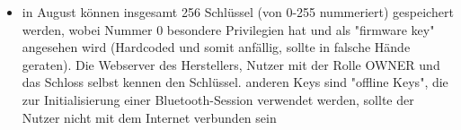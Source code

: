 \begin{itemize}
		    \item in August können insgesamt 256 Schlüssel (von 0-255 nummeriert) gespeichert werden, wobei Nummer 0 besondere Privilegien hat und als "firmware key" angesehen wird (\textrightarrow Hardcoded und somit anfällig, sollte in falsche Hände geraten).
		        Die Webserver des Herstellers, Nutzer mit der Rolle OWNER und das Schloss selbst kennen den Schlüssel.
		        anderen Keys sind "offline Keys", die zur Initialisierung einer Bluetooth-Session verwendet werden, sollte der Nutzer nicht mit dem Internet verbunden sein
		\end{itemize}
		
		
